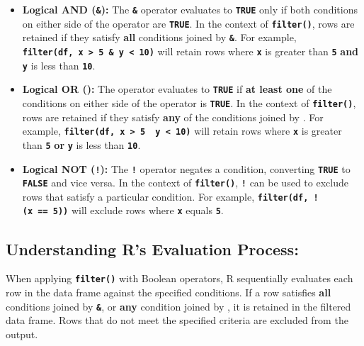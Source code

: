 \documentclass[
]{book}
\begin{document}
\begin{itemize}
\item
  \textbf{Logical AND (\texttt{\&}):} The \textbf{\texttt{\&}} operator evaluates to \textbf{\texttt{TRUE}} only if both conditions on either side of the operator are \textbf{\texttt{TRUE}}. In the context of \textbf{\texttt{filter()}}, rows are retained if they satisfy \textbf{all} conditions joined by \textbf{\texttt{\&}}. For example, \textbf{\texttt{filter(df,\ x\ \textgreater{}\ 5\ \&\ y\ \textless{}\ 10)}} will retain rows where \textbf{\texttt{x}} is greater than \textbf{\texttt{5}} \textbf{and} \textbf{\texttt{y}} is less than \textbf{\texttt{10}}.
\item
  \textbf{Logical OR (\texttt{\textbar{}}):} The \textbf{\texttt{\textbar{}}} operator evaluates to \textbf{\texttt{TRUE}} if \textbf{at least one} of the conditions on either side of the operator is \textbf{\texttt{TRUE}}. In the context of \textbf{\texttt{filter()}}, rows are retained if they satisfy \textbf{any} of the conditions joined by \textbf{\texttt{\textbar{}}}. For example, \textbf{\texttt{filter(df,\ x\ \textgreater{}\ 5\ \textbar{}\ y\ \textless{}\ 10)}} will retain rows where \textbf{\texttt{x}} is greater than \textbf{\texttt{5}} \textbf{or} \textbf{\texttt{y}} is less than \textbf{\texttt{10}}.
\item
  \textbf{Logical NOT (\texttt{!}):} The \textbf{\texttt{!}} operator negates a condition, converting \textbf{\texttt{TRUE}} to \textbf{\texttt{FALSE}} and vice versa. In the context of \textbf{\texttt{filter()}}, \textbf{\texttt{!}} can be used to exclude rows that satisfy a particular condition. For example, \textbf{\texttt{filter(df,\ !(x\ ==\ 5))}} will exclude rows where \textbf{\texttt{x}} equals \textbf{\texttt{5}}.
\end{itemize}

\hypertarget{understanding-rs-evaluation-process}{%
\subsection{Understanding R's Evaluation Process:}\label{understanding-rs-evaluation-process}}

When applying \textbf{\texttt{filter()}} with Boolean operators, R sequentially evaluates each row in the data frame against the specified conditions. If a row satisfies \textbf{all} conditions joined by \textbf{\texttt{\&}}, or \textbf{any} condition joined by \textbf{\texttt{\textbar{}}}, it is retained in the filtered data frame. Rows that do not meet the specified criteria are excluded from the output.
\end{document}
